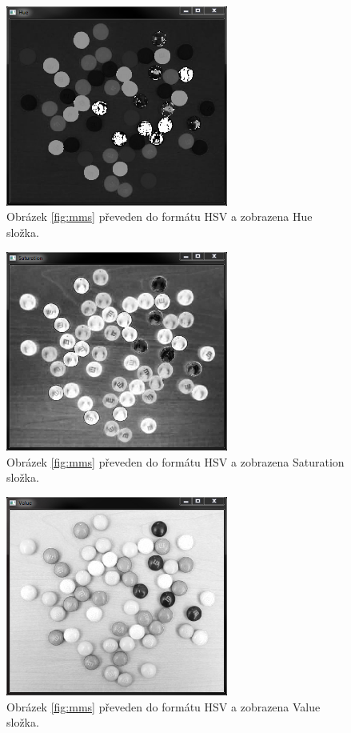 \documentclass[12pt, a4paper]{article}
\begin{document}
\begin{figure}[!ht]
	\centering
	\includegraphics[width = 0.65\textwidth]{Hue.png}
	\caption{Obrázek \ref{fig:mms} převeden do formátu HSV a zobrazena Hue složka.}	
	\label{fig:Hue}
\end{figure}

\begin{figure}[!ht]
	\centering
	\includegraphics[width = 0.65\textwidth]{Saturation.png}
	\caption{Obrázek \ref{fig:mms} převeden do formátu HSV a zobrazena Saturation složka.}	
	\label{fig:Saturation}
\end{figure}

\begin{figure}[!ht]
	\centering
	\includegraphics[width = 0.65\textwidth]{Value.png}
	\caption{Obrázek \ref{fig:mms} převeden do formátu HSV a zobrazena Value složka.}	
	\label{fig:Value}
\end{figure}
\end{document}
